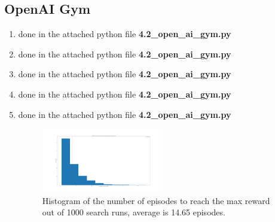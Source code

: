 \documentclass{assignmeownt}
\begin{document}
\subsection{OpenAI Gym}
    \begin{enumerate} %
        \item done in the attached python file \textbf{4.2\_open\_ai\_gym.py}
        \item done in the attached python file \textbf{4.2\_open\_ai\_gym.py}
        \item done in the attached python file \textbf{4.2\_open\_ai\_gym.py}
        \item done in the attached python file \textbf{4.2\_open\_ai\_gym.py}
        \item done in the attached python file \textbf{4.2\_open\_ai\_gym.py}
        \begin{figure}[h]
            \centering
            \includegraphics[width=0.5\textwidth]{4_2_5_hist.png}
            \caption{Histogram of the number of episodes to reach the max reward out of 1000 search runs, average is 14.65 episodes.}
            \label{fig:figure_label}
        \end{figure}
    \end{enumerate} %
\end{document}
